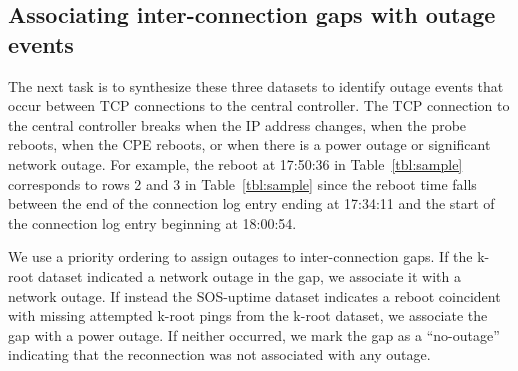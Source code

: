 \subsection{Associating inter-connection gaps with outage events}

The next task is to synthesize these three datasets to
identify outage events that occur between TCP connections to
the central controller.  The TCP connection to the central
controller breaks when the IP address changes, when the
probe reboots, when the CPE reboots, or when there is a
power outage or significant network outage.  For example,
the reboot at 17:50:36 in Table~\ref{tbl:sample} corresponds
to rows 2 and 3 in Table~\ref{tbl:sample} since the reboot
time falls between the end of the connection log entry
ending at 17:34:11 and the start of the connection log entry
beginning at 18:00:54.

We use a priority ordering to assign outages to inter-connection gaps.
If the k-root dataset indicated a network outage in the gap, we associate
it with a network outage.  If instead the SOS-uptime dataset indicates a
reboot coincident with missing attempted k-root pings from the k-root
dataset, we associate the gap with a power outage.  If neither occurred,
we mark the gap as a ``no-outage'' indicating that the reconnection was
not associated with any outage.

